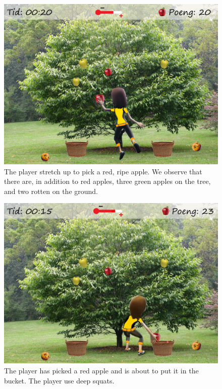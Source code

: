 \begin{figure} [H]
\centering
\includegraphics[scale=0.1]{gameappletree.jpg}
\caption[Picking apples - stretching]{The player stretch up to pick a red, ripe apple. We observe that there are, in addition to red apples, three green apples on the tree, and two rotten on the ground.}
\label{fig:appleStretch}
\end{figure}

\begin{figure} [H]
\centering
\includegraphics[scale=0.45]{squateple.jpg}
\caption[Picking apples - squats]{The player has picked a red apple and is about to put it in the bucket. The player use deep squats.}
\label{fig:appleSquat}
\end{figure}

